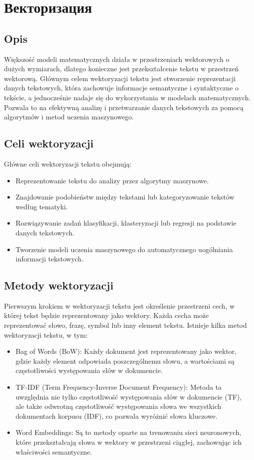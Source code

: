 \section{Векторизация}

	\subsection{Opis}
		Większość modeli matematycznych działa w przestrzeniach wektorowych o dużych wymiarach, dlatego konieczne jest przekształcenie tekstu w przestrzeń wektorową. Głównym celem wektoryzacji tekstu jest stworzenie reprezentacji danych tekstowych, która zachowuje informacje semantyczne i syntaktyczne o tekście, a jednocześnie nadaje się do wykorzystania w modelach matematycznych. Pozwala to na efektywną analizę i przetwarzanie danych tekstowych za pomocą algorytmów i metod uczenia maszynowego. \cite{Vectorization}

	\subsection{Celi wektoryzacji}
		Główne celi wektoryzacji tekstu obejmują:
		\begin{itemize}
			\item Reprezentowanie tekstu do analizy przez algorytmy maszynowe.
			\item Znajdowanie podobieństw między tekstami lub kategoryzowanie tekstów według tematyki.
			\item Rozwiązywanie zadań klasyfikacji, klasteryzacji lub regresji na podstawie danych tekstowych.
			\item Tworzenie modeli uczenia maszynowego do automatycznego uogólniania informacji tekstowych.
		\end{itemize}

	\subsection{Metody wektoryzacji}
		Pierwszym krokiem w wektoryzacji tekstu jest określenie przestrzeni cech, w której tekst będzie reprezentowany jako wektory. Każda cecha może reprezentować słowo, frazę, symbol lub inny element tekstu.
		Istnieje kilka metod wektoryzacji tekstu, w tym:
		\begin{itemize}
			\item Bag of Words (BoW): Każdy dokument jest reprezentowany jako wektor, gdzie każdy element odpowiada poszczególnemu słowu, a wartościami są częstotliwości występowania słów w dokumencie.
			\item TF-IDF (Term Frequency-Inverse Document Frequency): Metoda ta uwzględnia nie tylko częstotliwość występowania słów w dokumencie (TF), ale także odwrotną częstotliwość występowania słowa we wszystkich dokumentach korpusu (IDF), co pozwala wyróżnić słowa kluczowe.
			\item Word Embeddings: Są to metody oparte na trenowaniu sieci neuronowych, które przekształcają słowa w wektory w przestrzeni ciągłej, zachowując ich właściwości semantyczne.\
		\end{itemize}

